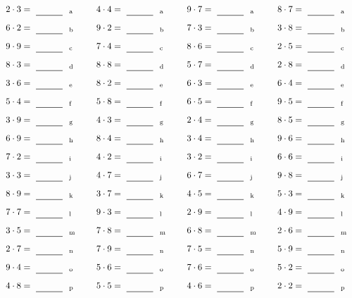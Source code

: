 \documentclass
[
  draft    = true,
  fontsize = 11pt,
  parskip  = half-
]
{scrartcl}
\begin{document}
\par\vfill\par
\begin{align*}
    \pline{2\cdot3}&=\rline{a}
  & \pline{4\cdot4}&=\rline{a}
  & \pline{9\cdot7}&=\rline{a}
  & \pline{8\cdot7}&=\rline{a} \\[1ex]
    \pline{6\cdot2}&=\rline{b}
  & \pline{9\cdot2}&=\rline{b}
  & \pline{7\cdot3}&=\rline{b}
  & \pline{3\cdot8}&=\rline{b} \\[1ex]
    \pline{9\cdot9}&=\rline{c}
  & \pline{7\cdot4}&=\rline{c}
  & \pline{8\cdot6}&=\rline{c}
  & \pline{2\cdot5}&=\rline{c} \\[1ex]
    \pline{8\cdot3}&=\rline{d}
  & \pline{8\cdot8}&=\rline{d}
  & \pline{5\cdot7}&=\rline{d}
  & \pline{2\cdot8}&=\rline{d} \\[1ex]
    \pline{3\cdot6}&=\rline{e}
  & \pline{8\cdot2}&=\rline{e}
  & \pline{6\cdot3}&=\rline{e}
  & \pline{6\cdot4}&=\rline{e} \\[1ex]
    \pline{5\cdot4}&=\rline{f}
  & \pline{5\cdot8}&=\rline{f}
  & \pline{6\cdot5}&=\rline{f}
  & \pline{9\cdot5}&=\rline{f} \\[1ex]
    \pline{3\cdot9}&=\rline{g}
  & \pline{4\cdot3}&=\rline{g}
  & \pline{2\cdot4}&=\rline{g}
  & \pline{8\cdot5}&=\rline{g} \\[1ex]
    \pline{6\cdot9}&=\rline{h}
  & \pline{8\cdot4}&=\rline{h}
  & \pline{3\cdot4}&=\rline{h}
  & \pline{9\cdot6}&=\rline{h} \\[1ex]
    \pline{7\cdot2}&=\rline{i}
  & \pline{4\cdot2}&=\rline{i}
  & \pline{3\cdot2}&=\rline{i}
  & \pline{6\cdot6}&=\rline{i} \\[1ex]
    \pline{3\cdot3}&=\rline{j}
  & \pline{4\cdot7}&=\rline{j}
  & \pline{6\cdot7}&=\rline{j}
  & \pline{9\cdot8}&=\rline{j} \\[1ex]
    \pline{8\cdot9}&=\rline{k}
  & \pline{3\cdot7}&=\rline{k}
  & \pline{4\cdot5}&=\rline{k}
  & \pline{5\cdot3}&=\rline{k} \\[1ex]
    \pline{7\cdot7}&=\rline{l}
  & \pline{9\cdot3}&=\rline{l}
  & \pline{2\cdot9}&=\rline{l}
  & \pline{4\cdot9}&=\rline{l} \\[1ex]
    \pline{3\cdot5}&=\rline{m}
  & \pline{7\cdot8}&=\rline{m}
  & \pline{6\cdot8}&=\rline{m}
  & \pline{2\cdot6}&=\rline{m} \\[1ex]
    \pline{2\cdot7}&=\rline{n}
  & \pline{7\cdot9}&=\rline{n}
  & \pline{7\cdot5}&=\rline{n}
  & \pline{5\cdot9}&=\rline{n} \\[1ex]
    \pline{9\cdot4}&=\rline{o}
  & \pline{5\cdot6}&=\rline{o}
  & \pline{7\cdot6}&=\rline{o}
  & \pline{5\cdot2}&=\rline{o} \\[1ex]
    \pline{4\cdot8}&=\rline{p}
  & \pline{5\cdot5}&=\rline{p}
  & \pline{4\cdot6}&=\rline{p}
  & \pline{2\cdot2}&=\rline{p}
\end{align*}
\end{document}
